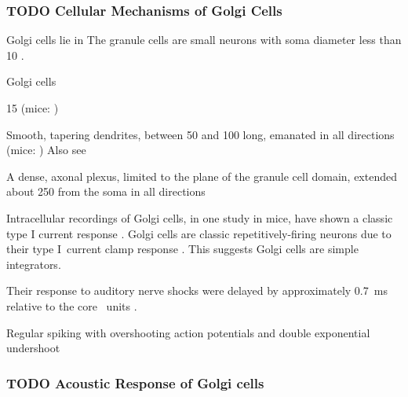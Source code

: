 \subsubsection{TODO Cellular Mechanisms of Golgi Cells}

Golgi cells lie in 
The granule cells are small neurons with soma diameter less than 10 \um \citep{MugnainiOsenEtAl:1980}.






Golgi cells                                

 15 \um (mice: \citep{FerragamoGoldingEtAl:1998})                     
 
Smooth, tapering dendrites, between 50 and 100 \um long, emanated in all directions (mice: \citep{FerragamoGoldingEtAl:1998})
Also see \citep{Cant:1993,MugnainiOsenEtAl:1980} 

A dense, axonal plexus, limited to the plane of the granule cell domain, extended about 250 \um
from the soma in all directions \citep{FerragamoGoldingEtAl:1998}


Intracellular recordings of Golgi cells, in one study in mice, have shown a classic type I current response  \citep{FerragamoGoldingEtAl:1998}.
Golgi cells are classic repetitively-firing neurons due to their type I~current clamp response \citep{FerragamoGoldingEtAl:1998}.  
This suggests Golgi cells are simple integrators.  

Their response to auditory nerve shocks were delayed by approximately 0.7~ms relative to the core \VCN~units \citep{FerragamoGoldingEtAl:1998}.

Regular spiking with overshooting action potentials and double exponential undershoot



    
\subsubsection{TODO Acoustic Response of Golgi cells}

